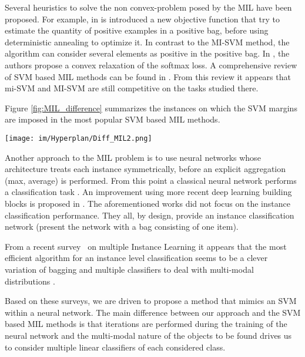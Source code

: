 \documentclass[preprint]{elsarticle}
\begin{document}
Several heuristics to solve the non convex-problem posed by the MIL have been proposed. For example, in  \cite{gehler_deterministic_2007} is introduced a new objective function that try to estimate the quantity of positive examples in a positive bag, before using deterministic annealing to optimize it. In contrast to the MI-SVM method, the algorithm can consider several elements as positive in the positive bag. In \cite{joulin_convex_2012}, the authors propose a convex relaxation of the softmax loss.  A comprehensive review of SVM based MIL methods can be found in   \cite{doran_theoretical_2014}. From this review it appears that mi-SVM and MI-SVM are still competitive on the tasks studied there. 
 



Figure \ref{fig:MIL_difference} summarizes the instances on which the SVM margins are imposed in the most popular SVM based MIL methods. 

\begin{figure*} \centering
    \texttt{[image: im/Hyperplan/Diff\_MIL2.png]}
    \caption{Comparison of standard SVM based MIL models. The blue dotted lines show the hyperplanes learned by the models, and the blue circles show the instances used during the SVM training. Figure must be seen in color.}
    \label{fig:MIL_difference}
\end{figure*}




 Another approach to the MIL problem is to use neural networks whose architecture treats each instance symmetrically, before an explicit aggregation (max, average) is performed. From this point a classical neural network performs a classification task  \cite{ramon_multi_2000,zhou_neural_2002}. An improvement  using more recent deep learning building blocks is proposed in \cite{wang_revisiting_2018}.  The aforementioned works did not focus on the instance classification performance. They all, by design, provide an instance classification network (present the network with a bag consisting of one item). 


From a recent survey~\cite{carbonneau_multiple_2016} on multiple Instance Learning it appears that the most efficient algorithm for an instance level classification seems to be a clever variation of bagging and multiple classifiers to deal with multi-modal distributions \cite{carbonneau_robust_2016}.



 Based on these surveys, we are driven to propose a method that mimics an SVM within a neural network. The main difference between our approach and the SVM based MIL methods is that iterations are performed during the training of the neural network and the multi-modal nature of the objects to be found drives us to consider multiple linear classifiers of each considered class.
\end{document}
